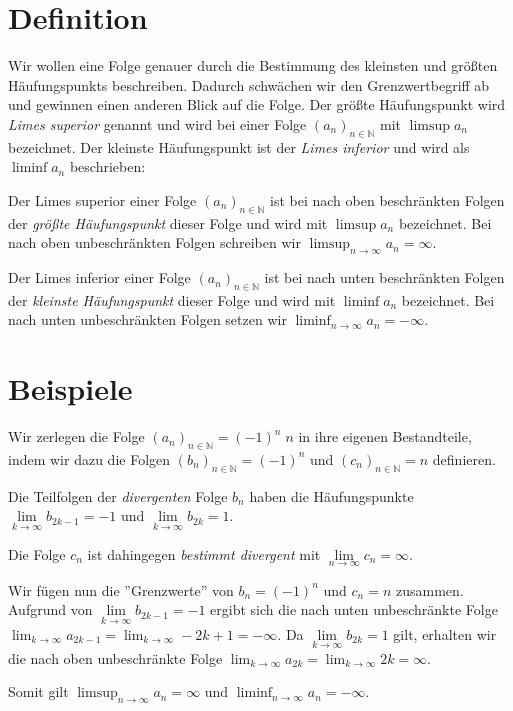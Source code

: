 \documentclass[fontsize=9pt,
               parskip=half-,
               DIV=14,
               listof=chapterentry,
               tocflat]{scrbook}
\begin{document}
\section{Definition}

Wir wollen eine Folge genauer durch die Bestimmung des kleinsten und größten Häufungspunkts beschreiben. Dadurch schwächen wir den Grenzwertbegriff ab und gewinnen einen anderen Blick auf die Folge. Der größte Häufungspunkt wird \emph{Limes superior} genannt und wird bei einer Folge $(a_{n})_{n\in \mathbb {N} }$ mit $\limsup a_{n}$ bezeichnet. Der kleinste Häufungspunkt ist der \emph{Limes inferior} und wird als $\liminf a_{n}$ beschrieben:

\begin{definition*}
Der Limes superior einer Folge $(a_{n})_{n\in \mathbb {N} }$ ist bei nach oben beschränkten Folgen der \emph{größte Häufungspunkt} dieser Folge und wird mit $\limsup a_{n}$ bezeichnet. Bei nach oben unbeschränkten Folgen schreiben wir $\limsup _{n\to \infty }a_{n}=\infty $.

\end{definition*}

\begin{definition*}
Der Limes inferior einer Folge $(a_{n})_{n\in \mathbb {N} }$ ist bei nach unten beschränkten Folgen der \emph{kleinste Häufungspunkt} dieser Folge und wird mit $\liminf a_{n}$ bezeichnet. Bei nach unten unbeschränkten Folgen setzen wir $\liminf _{n\to \infty }a_{n}=-\infty $.

\end{definition*}
\clearpage
\section{Beispiele}

\begin{example*}
Wir zerlegen die Folge $(a_{n})_{n\in \mathbb {N} }=(-1)^{n}\;n$ in ihre eigenen Bestandteile, indem wir dazu die Folgen $(b_{n})_{n\in \mathbb {N} }=(-1)^{n}$ und $(c_{n})_{n\in \mathbb {N} }=n$ definieren.

Die Teilfolgen der \emph{divergenten} Folge $b_{n}$ haben die Häufungspunkte $\lim \limits _{k\to \infty }b_{2k-1}=-1$ und $\lim \limits _{k\to \infty }b_{2k}=1$.

Die Folge $c_{n}$ ist dahingegen \emph{bestimmt divergent} mit $\lim \limits _{n\to \infty }c_{n}=\infty $.

Wir fügen nun die {''}Grenzwerte{''} von $b_{n}=(-1)^{n}$ und $c_{n}=n$ zusammen. Aufgrund von $\lim \limits _{k\to \infty }b_{2k-1}=-1$ ergibt sich die nach unten unbeschränkte Folge $\lim _{k\to \infty }a_{2k-1}=\lim _{k\to \infty }-2k+1=-\infty $. Da $\lim \limits _{k\to \infty }b_{2k}=1$ gilt, erhalten wir die nach oben unbeschränkte Folge $\lim _{k\to \infty }a_{2k}=\lim _{k\to \infty }2k=\infty $.

Somit gilt $\limsup _{n\to \infty }a_{n}=\infty $ und $\liminf _{n\to \infty }a_{n}=-\infty $.

\end{example*}
\end{document}
